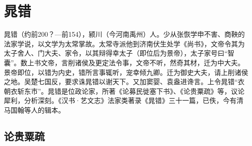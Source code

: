 \chapter{晁错}

\begin{authorintro}
晁错（约前200？—前154），颍川（今河南禹州）人。少从张恢学申不害、商鞅的法家学说，以文学为太常掌故。太常寺派他到济南伏生处学《尚书》，文帝令其为太子舍人、门大夫、家令，以其辩得幸太子（即位后为景帝），太子家号曰“智囊”。数上书文帝，言削诸侯及更定法令事，文帝不听，然奇其材，迁为中大夫。景帝即位，以错为内史，错所言事辄听，宠幸倾九卿。迁为御史大夫，请上削诸侯之地。吴楚七国反，要求诛晁错以谢天下。又加窦婴、袁盎进谗言。上令晁错“衣朝衣斩东市”。晁错是位政论家，所著《论募民徙塞下书》、《论贵粟疏》等，议论犀利，分析深刻。《汉书·艺文志》法家类著录《晁错》三十一篇，已佚，今有清马国翰等人的辑本。
\end{authorintro}

\section[论贵粟疏]{论贵粟疏}

